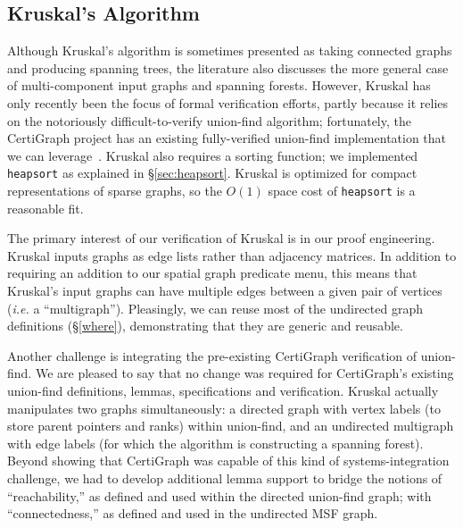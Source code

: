 \subsection{Kruskal's Algorithm}
\label{sec:kruskal}

Although Kruskal's algorithm is sometimes presented as taking connected graphs and producing spanning trees, the literature also discusses the more general case of multi-component input graphs and spanning forests.  However, Kruskal has only recently been the focus of formal verification efforts, partly because it relies on the notoriously difficult-to-verify union-find algorithm; fortunately, the CertiGraph project has an existing fully-verified union-find implementation that we can leverage~\cite{DBLP:journals/pacmpl/WangCMH19}.  Kruskal also requires a sorting function; we implemented \texttt{heapsort} as explained in \S\ref{sec:heapsort}.  Kruskal is optimized for compact representations of sparse graphs, so the $O(1)$ space cost of \texttt{heapsort} is a reasonable fit.  %

The primary interest of our verification of Kruskal is in our proof engineering.  Kruskal inputs graphs as edge lists rather than adjacency matrices.  In addition to requiring an addition to our spatial graph predicate menu, this means that Kruskal's input graphs can have multiple edges between a given pair of vertices (\emph{i.e.} a ``multigraph'').  Pleasingly, we can reuse most of the undirected graph definitions (\S\ref{where}), demonstrating that they are generic and reusable.

Another challenge is integrating the pre-existing CertiGraph verification of union-find.  We are pleased to say that no change was required for CertiGraph's existing union-find definitions, lemmas, specifications and verification.  Kruskal actually manipulates two graphs simultaneously: a directed graph with vertex labels (to store parent pointers and ranks) within union-find, and an undirected multigraph with edge labels (for which the algorithm is constructing a spanning forest).  Beyond showing that CertiGraph was capable of this kind of systems-integration challenge, we had to develop additional lemma support to bridge the notions of ``reachability,'' as defined and used within the directed union-find graph; with ``connectedness,'' as defined and used in the undirected MSF graph.

